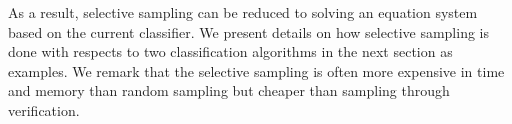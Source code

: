 As a result, selective sampling can be reduced to solving an equation system based on the current classifier. We present details on how selective sampling is done with respects to two classification algorithms in the next section as examples. We remark that the selective sampling is often more expensive in time and memory than random sampling but cheaper than sampling through verification.


